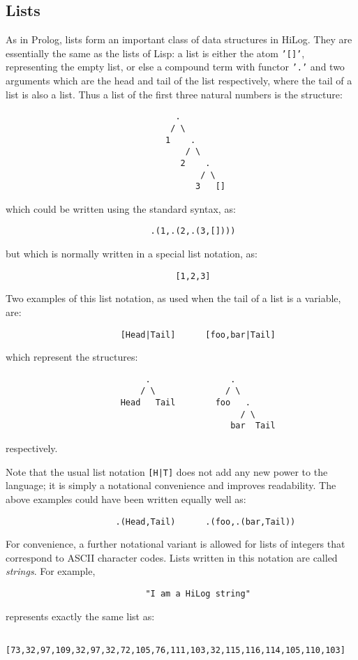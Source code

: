 \subsection{Lists}\label{Lists}
As in Prolog, lists form an important class of data structures in HiLog.
They are essentially the same as the lists of Lisp: a list is either the atom
{\tt '[]'}, representing the empty list, or else a compound term with functor
{\tt '.'}  and two arguments which are the head and tail of the list
respectively, where the tail of a list is also a list.
Thus a list of the first three natural numbers is the structure:
\begin{verbatim}
                                  .
                                 / \
                                1    .
                                    / \
                                   2    .
                                       / \
                                      3   []
\end{verbatim}
which could be written using the standard syntax, as:
\begin{verbatim}
                             .(1,.(2,.(3,[])))
\end{verbatim}
but which is normally written in a special list notation, as:
\begin{verbatim}
                                  [1,2,3]
\end{verbatim}
Two examples of this list notation, as used when the tail of a list is a
variable, are:
\begin{verbatim}
                       [Head|Tail]      [foo,bar|Tail]
\end{verbatim}
which represent the structures:
\begin{verbatim}
                            .                .
                           / \              / \
                       Head   Tail        foo   .
                                               / \
                                             bar  Tail
\end{verbatim}
respectively.

Note that the usual list notation {\tt [H|T]} does not add any new power
to the language; it is simply a notational convenience and improves
readability. The above examples could have been written equally well as:
\begin{verbatim}
                      .(Head,Tail)      .(foo,.(bar,Tail))
\end{verbatim}

For convenience, a further notational variant is allowed for lists of
integers that correspond to ASCII character codes.  Lists written in this
notation are called {\em strings}.  For example,
\begin{verbatim}
                            "I am a HiLog string"
\end{verbatim}
represents exactly the same list as:
\begin{verbatim}
    [73,32,97,109,32,97,32,72,105,76,111,103,32,115,116,114,105,110,103]
\end{verbatim}


